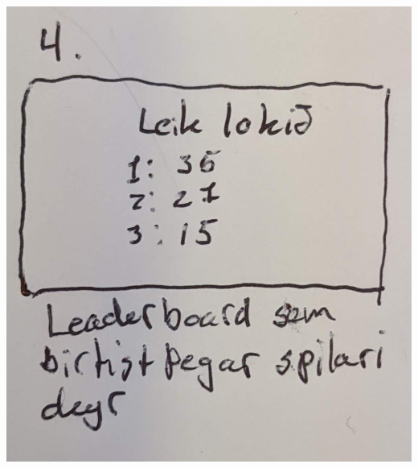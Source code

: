 \documentclass{article}
\begin{document}
\begin{center}
    \includegraphics[scale=0.2]{t4.jpg}
\end{center}
\end{document}
